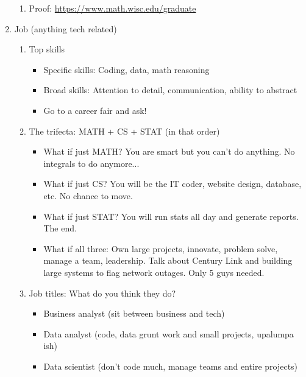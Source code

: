 \documentclass{article}
\theoremstyle{remark}
\begin{document}
\begin{enumerate}
\begin{enumerate}
\item Proof: \url{https://www.math.wisc.edu/graduate}

\end{enumerate}


\item Job (anything tech related)

\begin{enumerate}
\item Top skills
\begin{itemize}
\item Specific skills: Coding, data, math reasoning
\item Broad skills: Attention to detail, communication, ability to abstract
\item Go to a career fair and ask!
\end{itemize}


\item The trifecta: MATH + CS + STAT (in that order)
\begin{itemize}
\item What if just MATH? You are smart but you can't do anything. No integrals to do anymore...
\item What if just CS? You will be the IT coder, website design, database, etc. No chance to move.
\item What if just STAT? You will run stats all day and generate reports. The end.
\item What if all three: Own large projects, innovate, problem solve, manage a team, leadership. Talk about Century Link and building large systems to flag network outages. Only 5 guys needed. 
\end{itemize}

\item Job titles: What do you think they do?
\begin{itemize}
\item Business analyst (sit between business and tech)
\item Data analyst (code, data grunt work and small projects, upalumpa ish)
\item Data scientist (don't code much, manage teams and entire projects)
\end{itemize}


\end{enumerate}
\end{enumerate}
\end{document}
